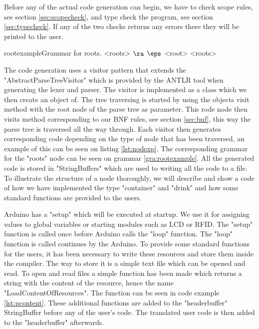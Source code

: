 Before any of the actual code generation can begin, we have to check scope rules, see section \ref{sec:scopecheck}, and type check the program, see section \ref{sec:typecheck}. If any of the two checks returns any errors there they will be printed to the user. 


\begin{grammatik}{rootexample}{Grammar for roots.}
<roots> $\ra$ $\eps$
\alt <root> <roots>
\end{grammatik}

The code generation uses a visitor pattern that extends the "AbstractParseTreeVisitor" which is provided by the ANTLR tool when generating the lexer and parser. The visitor is implemented as a class which we then create an object of. The tree traversing is started by using the objects visit method with the root node of the parse tree as parameter. This rode node then visits method corresponding to our BNF rules, see section \ref{sec:bnf}, this way the parse tree is traversed all the way through. Each visitor then generates corresponding code depending on the type of node that has been traversed, an example of this can be seen on listing \ref{lst:nodexp}. The corresponding grammar for the "roots" node can be seen on grammar \ref{gra:rootexample}. All the generated code is stored in "StringBuffers" which are used to writing all the code to a file. To illustrate the structure of a node thoroughly, we will describe and show a code of how we have implemented the type "container" and "drink" and how some standard functions are provided to the users.


Arduino has a "setup" which will be executed at startup. We use it for assigning values to global variables or starting modules such as LCD or RFID. The "setup" function is called once before Arduino calls the "loop" function. The "loop" function is called continues by the Arduino. To provide some standard functions for the users, it has been necessary to write these resources and store them inside the compiler. The way to store it is a simple text file which can be opened and read. To open and read files a simple function has been made which returns a string with the content of the resource, hence the name "LoadContentOfResources". The function can be seen in code example \ref{lst:pcontent}. These additional functions are added to the "headerbuffer" StringBuffer before any of the user's code. The translated user code is then added to the "headerbuffer" afterwards.

